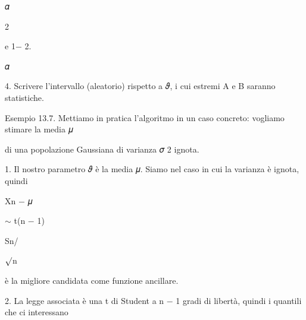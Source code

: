 \documentclass[a4paper,portrait,12pt]{article}
\begin{document}
\begin{flushleft}
𝛼
\end{flushleft}


2





\begin{flushleft}
e 1$-$ 2.
\end{flushleft}


\begin{flushleft}
𝛼
\end{flushleft}





\begin{flushleft}
4. Scrivere l'intervallo (aleatorio) rispetto a 𝜗, i cui estremi A e B saranno statistiche.
\end{flushleft}


\begin{flushleft}
Esempio 13.7. Mettiamo in pratica l'algoritmo in un caso concreto: vogliamo stimare la media 𝜇
\end{flushleft}


\begin{flushleft}
di una popolazione Gaussiana di varianza 𝜎 2 ignota.
\end{flushleft}


\begin{flushleft}
1. Il nostro parametro 𝜗 \`{e} la media 𝜇. Siamo nel caso in cui la varianza \`{e} ignota, quindi
\end{flushleft}


\begin{flushleft}
Xn $-$ 𝜇
\end{flushleft}


\begin{flushleft}
$\sim$ t(n $-$ 1)
\end{flushleft}


\begin{flushleft}
Sn/
\end{flushleft}


\begin{flushleft}
$\surd$n
\end{flushleft}


\begin{flushleft}
\`{e} la migliore candidata come funzione ancillare.
\end{flushleft}


\begin{flushleft}
2. La legge associata \`{e} una t di Student a n $-$ 1 gradi di libert\`{a}, quindi i quantili che ci interessano
\end{flushleft}
\end{document}
